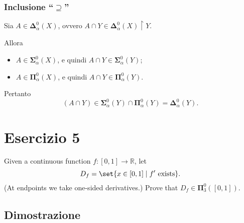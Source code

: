 \documentclass{article}
\newcommand{\1}{\mathds{1}}
\newcommand{\qedd}{\tag*{$\blacksquare$}} %
\begin{document}
\subsubsection{Inclusione ``\(\supseteq\)''}
\label{sec:org72a6ff9}

Sia \(A \in \bm{\Delta}^{0}_{\alpha}(X)\), ovvero \(A\cap Y \in \bm{\Delta}^{0}_{\alpha}(X)\upharpoonright Y\).

Allora
\begin{itemize}
\item \(A \in \bm{\Sigma}^{0}_{\alpha}(X)\), e quindi \(A\cap Y \in \bm{\Sigma}^{0}_{\alpha}(Y)\);
\item \(A \in \bm{\Pi}^{0}_{\alpha}(X)\), e quindi \(A\cap Y \in \bm{\Pi}^{0}_{\alpha}(Y)\).
\end{itemize}

Pertanto
\begin{equation*}
(A\cap Y) \in \bm{\Sigma}^{0}_{\alpha}(Y)\cap \bm{\Pi}^{0}_{\alpha}(Y) = \bm{\Delta}^{0}_{\alpha}(Y).\qedd
\end{equation*}
\section{Esercizio 5}
\label{sec:org27d4296}

Given a continuous function \(f : [0, 1] \to \mathbb{R}\), let
\[
D_f = \set{ x \in [0, 1] \mid f' \text{ exists}}.
\]
(At endpoints we take one-sided derivatives.) Prove that \(D_f \in \bm{\Pi}^{0}_{3}\left([0,1]\right)\).
\subsection{Dimostrazione}
\label{sec:orgf68e587}
\end{document}
